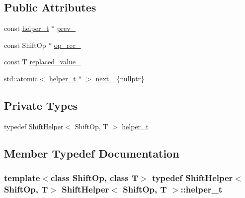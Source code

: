\subsection*{Public Attributes}
\begin{DoxyCompactItemize}
\item 
const \hyperlink{class_shift_helper_a4aef867507bfd1c5db6c66d3902c1ac4}{helper\+\_\+t} $\ast$ \hyperlink{class_shift_helper_a78998ae32b1b34120e66ab954a5faeca}{prev\+\_\+}
\item 
const Shift\+Op $\ast$ \hyperlink{class_shift_helper_aed2e1221ed06fb90eb37979339229ef9}{op\+\_\+rec\+\_\+}
\item 
const T \hyperlink{class_shift_helper_ad138be20f4364f297e3c809eda6136c4}{replaced\+\_\+value\+\_\+}
\item 
std\+::atomic$<$ \hyperlink{class_shift_helper_a4aef867507bfd1c5db6c66d3902c1ac4}{helper\+\_\+t} $\ast$ $>$ \hyperlink{class_shift_helper_a04a511ddc0133148d98c38cad0a73e16}{next\+\_\+} \{nullptr\}
\end{DoxyCompactItemize}
\subsection*{Private Types}
\begin{DoxyCompactItemize}
\item 
typedef \hyperlink{class_shift_helper}{Shift\+Helper}$<$ Shift\+Op, T $>$ \hyperlink{class_shift_helper_a4aef867507bfd1c5db6c66d3902c1ac4}{helper\+\_\+t}
\end{DoxyCompactItemize}


\subsection{Member Typedef Documentation}
\hypertarget{class_shift_helper_a4aef867507bfd1c5db6c66d3902c1ac4}{}
\subsubsection[{helper\+\_\+t}]{\setlength{\rightskip}{0pt plus 5cm}template$<$class Shift\+Op, class T$>$ typedef {\bf Shift\+Helper}$<$Shift\+Op, T$>$ {\bf Shift\+Helper}$<$ Shift\+Op, T $>$\+::{\bf helper\+\_\+t}\hspace{0.3cm}{\ttfamily [private]}}\label{class_shift_helper_a4aef867507bfd1c5db6c66d3902c1ac4}


